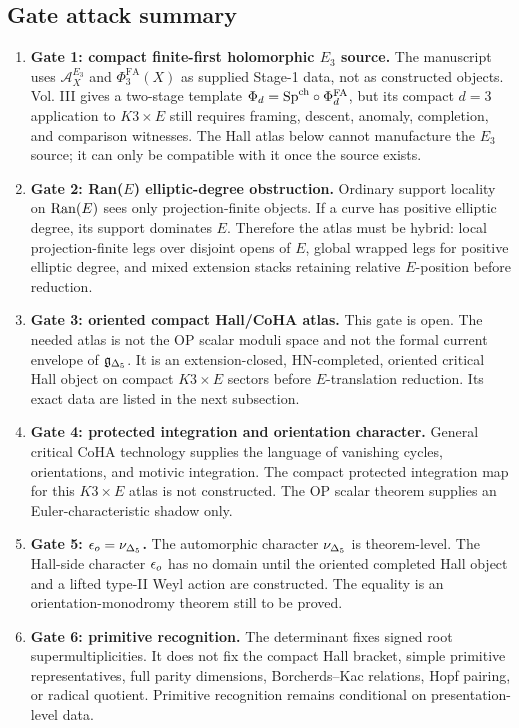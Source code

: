 \subsection{Gate attack summary}

\begin{enumerate}
\item \textbf{Gate 1: compact finite-first holomorphic \(E_3\) source.}
The manuscript uses \(\mathcal A_X^{E_3}\) and
\(\Phi^{\mathrm{FA}}_3(X)\) as supplied Stage-1 data, not as constructed
objects.  Vol. III gives a two-stage template
\(\Phi_d=\mathrm{Sp}^{\mathrm{ch}}\circ\Phi_d^{\mathrm{FA}}\), but its compact \(d=3\)
application to \(K3\times E\) still requires framing, descent, anomaly,
completion, and comparison witnesses.  The Hall atlas below cannot
manufacture the \(E_3\) source; it can only be compatible with it once
the source exists.

\item \textbf{Gate 2: Ran(\(E\)) elliptic-degree obstruction.}
Ordinary support locality on \(\operatorname{Ran}(E)\) sees only projection-finite
objects.  If a curve has positive elliptic degree, its support
dominates \(E\).  Therefore the atlas must be hybrid: local
projection-finite legs over disjoint opens of \(E\), global wrapped legs
for positive elliptic degree, and mixed extension stacks retaining
relative \(E\)-position before reduction.

\item \textbf{Gate 3: oriented compact Hall/CoHA atlas.}
This gate is open.  The needed atlas is not the OP scalar moduli space
and not the formal current envelope of \(\mathfrak g_{\Delta_5}\).  It is an
extension-closed, HN-completed, oriented critical Hall object on compact
\(K3\times E\) sectors before \(E\)-translation reduction.  Its exact
data are listed in the next subsection.

\item \textbf{Gate 4: protected integration and orientation character.}
General critical CoHA technology supplies the language of vanishing
cycles, orientations, and motivic integration.  The compact protected
integration map for this \(K3\times E\) atlas is not constructed.  The
OP scalar theorem supplies an Euler-characteristic shadow only.

\item \textbf{Gate 5: \(\epsilon_o=\nu_{\Delta_5}\).}
The automorphic character \(\nu_{\Delta_5}\) is theorem-level.  The Hall-side
character \(\epsilon_o\) has no domain until the oriented completed Hall
object and a lifted type-II Weyl action are constructed.  The equality
is an orientation-monodromy theorem still to be proved.

\item \textbf{Gate 6: primitive recognition.}
The determinant fixes signed root supermultiplicities.  It does not fix
the compact Hall bracket, simple primitive representatives, full parity
dimensions, Borcherds--Kac relations, Hopf pairing, or radical quotient.
Primitive recognition remains conditional on presentation-level data.
\end{enumerate}

